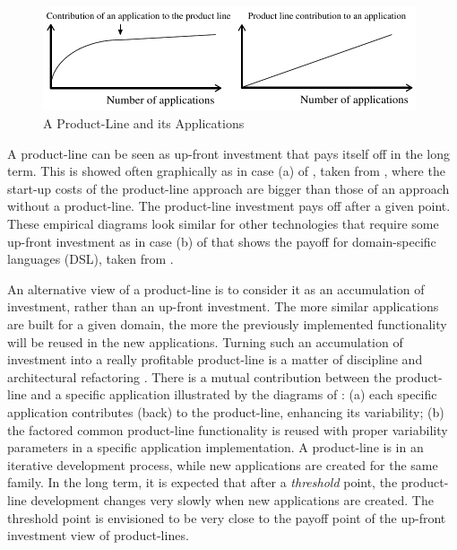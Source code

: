 \begin{figure}[ht]
	\begin{center}
		\includegraphics[width=11cm,height=!]{ch02/productline}
	\end{center}
	\caption{A Product-Line and its Applications}
	\label{fig:productline}
\end{figure}

A product-line can be seen as up-front investment that pays itself off in the long term. This is showed often graphically as in case (a) of , taken from \cite{pl.02}, where the start-up costs of the product-line approach are bigger than those of an approach without a product-line. The product-line investment pays off after a given point. These empirical diagrams look similar for other technologies that require some up-front investment as in case (b) of  that shows the payoff for domain-specific languages (DSL), taken from \cite{hudak98modular}.

An alternative view of a product-line is to consider it as an accumulation of investment, rather than an up-front investment. The more similar applications are built for a given domain, the more the previously implemented functionality will be reused in the new applications. Turning such an accumulation of investment into a really profitable product-line is a matter of discipline and architectural refactoring \cite{refactor.99,sf.04}. There is a mutual contribution between the product-line and a specific application illustrated by the diagrams of : (a) each specific application contributes (back) to the product-line, enhancing its variability; (b) the factored common product-line functionality is reused with proper variability parameters in a specific application implementation. A product-line is in an iterative development process, while new applications are created for the same family. In the long term, it is expected that after a \textit{threshold} point, the product-line development changes very slowly when new applications are created. The threshold point is envisioned to be very close to the payoff point of the up-front investment view of product-lines.

